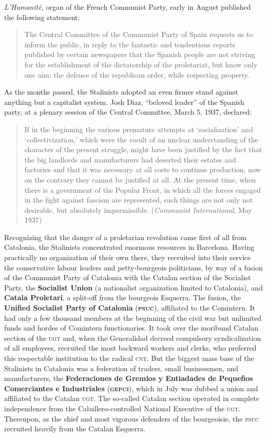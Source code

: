 \emph{L’Humanité}, organ of the French Communist Party, early in August published the following statement:
\begin{quote}
  The Central Committee of the Communist Party of Spain requests us to inform the public, in reply to the fantastic and tendentious reports published by certain newspapers that the Spanish people are not striving for the establishment of the dictatorship of the proletariat, but know only one aim: the defence of the republican order, while respecting property.
\end{quote}
As the months passed, the Stalinists adopted an even firmer stand against anything but a capitalist system. Josh Diaz, ``beloved leader'' of the Spanish party, at a plenary session of the Central Committee, March 5, 1937, declared:
\begin{quote}
  If in the beginning the various premature attempts at ‘socialization’ and ‘collectivization,’ which were the result of an unclear understanding of the character of the present struggle, might have been justified by the fact that the big landlords and manufacturers had deserted their estates and factories and that it was necessary at all costs to continue production, now on the contrary they cannot be justified at all. At the present time, when there is a government of the Popular Front, in which all the forces engaged in the fight against fascism are represented, such things are not only not desirable, but absolutely impermissible. (\emph{Communist International}, May 1937)
\end{quote}
Recognizing that the danger of a proletarian revolution came first of all from Catalonia, the Stalinists concentrated enormous resources in Barcelona. Having practically no organization of their own there, they recruited into their service the conservative labour leaders and petty-bourgeois politicians, by way of a fusion of the Communist Party of Catalonia with the Catalan section of the Socialist Party, the \textbf{Socialist Union} (a nationalist organization limited to Catalonia), and \textbf{Catala Proletari}, a split-off from the bourgeois Esquerra. The fusion, the \textbf{Unified Socialist Party of Catalonia} (\textbf{\textsc{psuc}}), affiliated to the Comintern. It had only a few thousand members at the beginning of the civil war but unlimited funds and hordes of Comintern functionaries. It took over the moribund Catalan section of the \textsc{ugt} and, when the Generalidad decreed compulsory syndicalization of all employees, recruited the most backward workers and clerks, who preferred this respectable institution to the radical \textsc{cnt}. But the biggest mass base of the Stalinists in Catalonia was a federation of traders, small businessmen, and manufacturers, the \textbf{Federaciones de Gremios y Entiadades de Pequefios Comerciantes e Industriales} (\textbf{\textsc{gepci}}), which in July was dubbed a union and affiliated to the Catalan \textsc{ugt}. The so-called Catalan section operated in complete independence from the Caballero-controlled National Executive of the \textsc{ugt}. Thereupon, as the chief and most vigorous defenders of the bourgeoisie, the \textsc{psuc} recruited heavily from the Catalan Esquerra.

